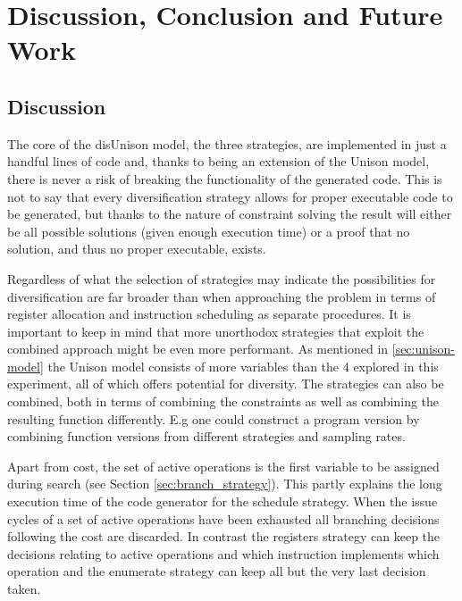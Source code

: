 \chapter{Discussion, Conclusion and Future Work}
\label{chapter:discussion}

\section{Discussion}
\label{sec:discussion}

The core of the disUnison model, the three strategies, are implemented in just a handful
lines of code and, thanks to being an extension of the Unison model, there is never a risk
of breaking the functionality of the generated code. This is not to say that every
diversification strategy allows for proper executable code to be generated, but thanks to
the nature of constraint solving the result will either be all possible solutions
(given enough execution time) or a proof that no solution, and thus no proper executable,
exists.

Regardless of what the selection of strategies may indicate the possibilities for
diversification are far broader than when approaching the problem in terms of register
allocation and instruction scheduling as separate procedures. It is important to keep in
mind that more unorthodox strategies that exploit the combined approach might be even
more performant. As mentioned in \ref{sec:unison-model} the Unison model consists of more
variables than the 4 explored in this experiment, all of which offers potential for
diversity. The strategies can also be combined, both in terms of combining the constraints
as well as combining the resulting function differently. E.g one could construct a program
version by combining function versions from different strategies and sampling rates.

Apart from cost, the set of active operations is the first variable to be assigned during
search (see Section \ref{sec:branch_strategy}). This partly explains the long execution
time of the code generator for the schedule strategy. When the issue cycles of a set of
active operations have been exhausted all branching decisions following the cost are
discarded. In contrast the registers strategy can keep the decisions relating to active
operations and which instruction implements which operation and the enumerate strategy can
keep all but the very last decision taken.

